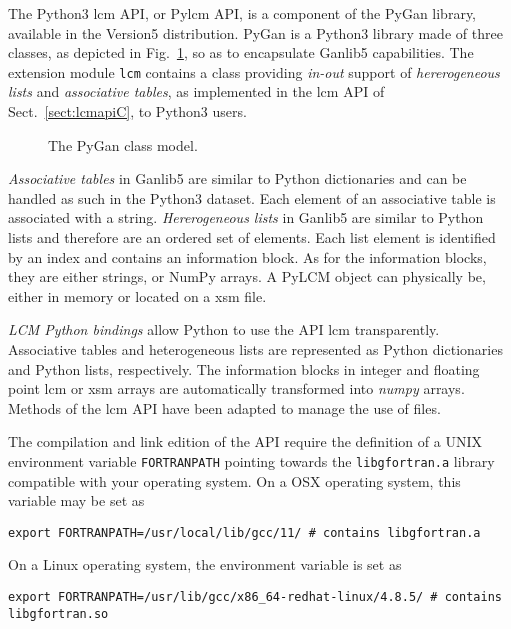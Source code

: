 The Python3 {\sc lcm} API, or Py{\sc lcm} API, is a component of the PyGan library, available in the Version5 distribution.
PyGan is a Python3 library made of three classes, as depicted in Fig.~\ref{fig:PyGan}, so as to encapsulate Ganlib5 capabilities.
The extension module {\tt lcm} contains a class providing {\sl in-out} support of {\sl hererogeneous lists} and
{\sl associative tables}, as implemented in the {\sc lcm} API of Sect.~\ref{sect:lcmapiC}, to Python3 users.

\begin{figure}[htbp]
\begin{center} 
\epsfxsize=2.4cm
\centerline{ }
\parbox{12cm}{\caption{The PyGan class model.}\label{fig:PyGan}}
\end{center}  
\end{figure}

\vskip 0.2cm

{\sl Associative tables} in Ganlib5 are similar to Python dictionaries and can be handled
as such in the Python3 dataset.  Each element of an associative table
 is associated with a string.
{\sl Hererogeneous lists} in Ganlib5 are similar to Python lists and therefore are an ordered set
of elements. Each list element is identified by an index and contains
an information block. As for the information blocks, they are either
strings, or NumPy arrays.
A PyLCM object can physically be, either in memory or located on a {\sc xsm} file.

\vskip 0.2cm

{\sl LCM Python bindings} allow Python to use the API
{\sc lcm} transparently. Associative tables and heterogeneous lists are
represented as Python dictionaries and Python lists, respectively. The
information blocks in integer and floating point {\sc lcm} or {\sc xsm} arrays
are automatically transformed into {\sl numpy} arrays.
Methods of the {\sc lcm} API have been adapted to manage the use of files.

\vskip 0.2cm

The compilation and link edition of the API require the definition of a UNIX environment variable {\tt FORTRANPATH} pointing towards the {\tt libgfortran.a} library
compatible with your operating system. On a OSX operating system, this variable may be set as
\begin{verbatim}
export FORTRANPATH=/usr/local/lib/gcc/11/ # contains libgfortran.a
\end{verbatim}
\noindent On a Linux operating system, the environment variable is set as
\begin{verbatim}
export FORTRANPATH=/usr/lib/gcc/x86_64-redhat-linux/4.8.5/ # contains libgfortran.so
\end{verbatim}

